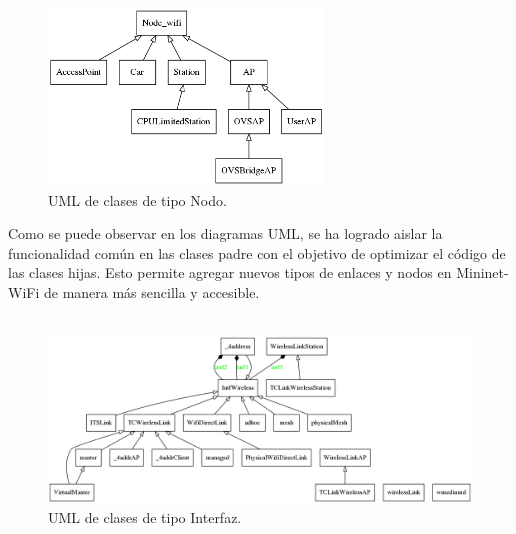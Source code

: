 \begin{figure}[ht]
    \centering
    \includegraphics[width=0.65\textwidth]{archivos/img/teoria/uml_node.png}
    \caption{UML de clases de tipo Nodo.}
    \label{fig:analysis_p4_wifi_4}
\end{figure}



Como se puede observar en los diagramas UML, se ha logrado aislar la funcionalidad común en las clases padre con el objetivo de optimizar el código de las clases hijas. Esto permite agregar nuevos tipos de enlaces y nodos en Mininet-WiFi de manera más sencilla y accesible.\\
\\

\begin{figure}[ht]
    \centering
    \includegraphics[width=\textwidth]{archivos/img/teoria/uml_link.png}
    \caption{UML de clases de tipo Interfaz.}
    \label{fig:analysis_p4_wifi_5}
\end{figure}


